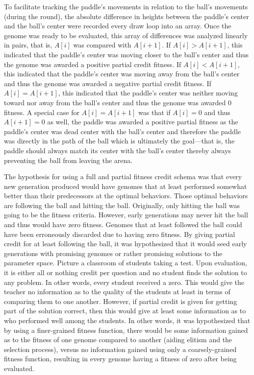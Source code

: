 To facilitate tracking the paddle's movements in relation to the ball's movements (during the round), the absolute difference in heights between the paddle's center and the ball's center were recorded every draw loop into an array. Once the genome was ready to be evaluated, this array of differences was analyzed linearly in pairs, that is, $A[i]$ was compared with $A[i+1]$. If $A[i]>A[i+1]$, this indicated that the paddle's center was moving closer to the ball's center and thus the genome was awarded a positive partial credit fitness. If $A[i]<A[i+1]$, this indicated that the paddle's center was moving away from the ball's center and thus the genome was awarded a negative partial credit fitness. If $A[i]=A[i+1]$, this indicated that the paddle's center was neither moving toward nor away from the ball's center and thus the genome was awarded $0$ fitness. A special case for $A[i]=A[i+1]$ was that if $A[i]=0$ and thus $A[i+1]=0$ as well, the paddle was awarded a positive partial fitness as the paddle's center was dead center with the ball's center and therefore the paddle was directly in the path of the ball which is ultimately the goal---that is, the paddle should always match its center with the ball's center thereby always preventing the ball from leaving the arena.

The hypothesis for using a full and partial fitness credit schema was that every new generation produced would have genomes that at least performed somewhat better than their predecessors at the optimal behaviors. Those optimal behaviors are following the ball and hitting the ball. Originally, only hitting the ball was going to be the fitness criteria. However, early generations may never hit the ball and thus would have zero fitness. Genomes that at least followed the ball could have been erroneously discarded due to having zero fitness. By giving partial credit for at least following the ball, it was hypothesized that it would seed early generations with promising genomes or rather promising solutions to the parameter space. Picture a classroom of students taking a test. Upon evaluation, it is either all or nothing credit per question and no student finds the solution to any problem. In other words, every student received a zero. This would give the teacher no information as to the quality of the students at least in terms of comparing them to one another. However, if partial credit is given for getting part of the solution correct, then this would give at least some information as to who performed well among the students. In other words, it was hypothesized that by using a finer-grained fitness function, there would be some information gained as to the fitness of one genome compared to another (aiding elitism and the selection process), versus no information gained using only a coarsely-grained fitness function, resulting in every genome having a fitness of zero after being evaluated.

